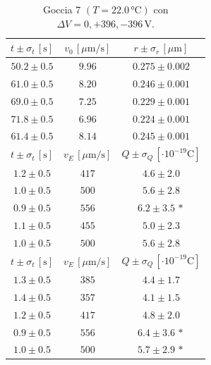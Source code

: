 \documentclass[]{article}
\begin{document}
    \begin{table}[H]
        \centering
        \begin{tabular}{||c|c|c||}
            \hline
            $t \pm \sigma_t \, \left[\text{s}\right]$ & $v_0 \, \left[\mu\text{m/s}\right]$ & $r \pm \sigma_r \, \left[\mu\text{m}\right]$ \\\hline
            \hline
            $50.2 \pm 0.5$ & $9.96$ & $0.275 \pm 0.002$ \\\hline
            $61.0 \pm 0.5$ & $8.20$ & $0.246 \pm 0.001$ \\\hline
            $69.0 \pm 0.5$ & $7.25$ & $0.229 \pm 0.001$ \\\hline
            $71.8 \pm 0.5$ & $6.96$ & $0.224 \pm 0.001$ \\\hline
            $61.4 \pm 0.5$ & $8.14$ & $0.245 \pm 0.001$ \\\hline
            \hline
            $t \pm \sigma_t \, \left[\text{s}\right]$ & $v_E \, \left[\mu\text{m/s}\right]$ & $Q \pm \sigma_Q \, \left[\cdot 10^{-19} \text{C}\right]$ \\\hline
            \hline
            $1.2 \pm 0.5$ & $417$ & $4.6 \pm 2.0$ \\\hline
            $1.0 \pm 0.5$ & $500$ & $5.6 \pm 2.8$ \\\hline
            $0.9 \pm 0.5$ & $556$ & $6.2 \pm 3.5\,\ast$ \\\hline
            $1.1 \pm 0.5$ & $455$ & $5.0 \pm 2.3$ \\\hline
            $1.0 \pm 0.5$ & $500$ & $5.6 \pm 2.8$ \\\hline
            \hline
            $t \pm \sigma_t \, \left[\text{s}\right]$ & $v_E \, \left[\mu\text{m/s}\right]$ & $Q \pm \sigma_Q \, \left[\cdot 10^{-19} \text{C}\right]$ \\\hline
            \hline
            $1.3 \pm 0.5$ & $385$ & $4.4 \pm 1.7$ \\\hline
            $1.4 \pm 0.5$ & $357$ & $4.1 \pm 1.5$ \\\hline
            $1.2 \pm 0.5$ & $417$ & $4.8 \pm 2.0$ \\\hline
            $0.9 \pm 0.5$ & $556$ & $6.4 \pm 3.6\,\ast$ \\\hline
            $1.0 \pm 0.5$ & $500$ & $5.7 \pm 2.9\,\ast$ \\\hline
        \end{tabular}
        \caption{Goccia 7 $\left(T = 22.0\, \text{°C}\right)$ con $\Delta V = 0,+396,-396 \,\text{V}$.}
        \label{goccia-7}
    \end{table}
\end{document}
